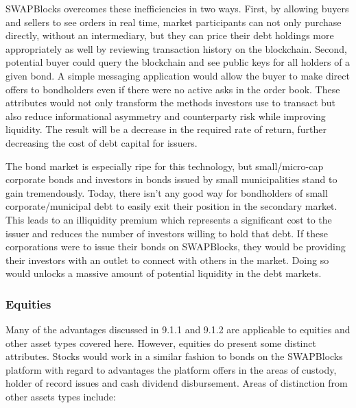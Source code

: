 \documentclass[12pt]{article}
\begin{document}
SWAPBlocks overcomes these inefficiencies in two ways. First, by allowing buyers and sellers to see orders in real time, 
market participants can not only purchase directly, without an intermediary, but they can price their debt holdings more 
appropriately as well by reviewing transaction history on the blockchain. Second, potential buyer could query the blockchain 
and see public keys for all holders of a given bond. 
A simple messaging application would allow the buyer to make direct offers to bondholders even if there were no active asks in 
the order book. These attributes would not only transform the methods investors use to transact but also reduce informational 
asymmetry and counterparty risk while improving liquidity. The result will be a decrease in the required rate of return, 
further decreasing the cost of debt capital for issuers.

The bond market is especially ripe for this technology, but small/micro-cap corporate bonds and investors in bonds issued by small
municipalities stand to gain 
tremendously. Today, there isn’t any good way for bondholders of small corporate/municipal debt to easily exit their position 
in the secondary market. This leads to an illiquidity premium which represents a significant cost to the issuer and 
reduces the number of investors willing to hold that debt. If these corporations were to issue their bonds on SWAPBlocks, 
they would be providing their investors with an outlet to connect with others in the market. Doing so would unlocks a 
massive amount of potential liquidity in the debt markets.

\subsubsection{Equities}
Many of the advantages discussed in 9.1.1 and 9.1.2 are applicable to equities and other asset types covered here. 
However, equities do present some distinct attributes. Stocks would work in a similar fashion to bonds on the SWAPBlocks 
platform with regard to advantages the platform offers in the areas of custody, holder of record issues and cash 
dividend disbursement. Areas of distinction from other assets types include:
\end{document}
